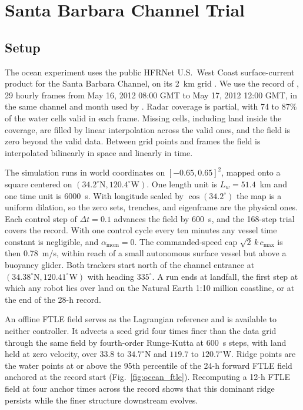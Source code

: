\documentclass[lettersize,journal]{IEEEtran}
\begin{document}
\section{Santa Barbara Channel Trial}
\label{sec:ocean}

\subsection{Setup}
\label{sec:ocean_sim}

The ocean experiment uses the public HFRNet U.S.~West Coast surface-current
product for the Santa Barbara Channel, on its 2~km grid \cite{34,36}. We
use the record of \cite{26}, 29 hourly frames from May 16, 2012 08:00 GMT
to May 17, 2012 12:00 GMT, in the same channel and month used by
\cite{29}. Radar coverage is partial, with 74 to 87\% of the water cells
valid in each frame. Missing cells, including land inside the coverage, are
filled by linear interpolation across the valid ones, and the field is zero
beyond the valid data. Between grid points and frames the field is
interpolated bilinearly in space and linearly in time.

The simulation runs in world coordinates on $[-0.65, 0.65]^2$, mapped onto
a square centered on $(34.2^{\circ}\mathrm{N}, 120.4^{\circ}\mathrm{W})$.
One length unit is $L_w = 51.4$~km and one time unit is 6000~s. With
longitude scaled by $\cos(34.2^{\circ})$ the map is a uniform dilation, so
the zero sets, trenches, and eigenframe are the physical ones. Each control
step of $\Delta t = 0.1$ advances the field by 600~s, and the 168-step trial
covers the record. With one control cycle every ten minutes any vessel
time constant is negligible, and $\alpha_{\text{mom}} = 0$. The
commanded-speed cap $\sqrt{2}\,k\,c_{\max}$ is then 0.78~m/s, within reach
of a small autonomous surface vessel but above a buoyancy glider. Both
trackers start north of the channel entrance at
$(34.38^{\circ}\mathrm{N}, 120.41^{\circ}\mathrm{W})$ with heading
$335^\circ$. A run ends at landfall, the first step at which any robot lies
over land on the Natural Earth 1:10 million coastline, or at the end of the
28-h record.

An offline FTLE field serves as the Lagrangian reference \cite{17} and is
available to neither controller. It advects a seed grid four times finer
than the data grid through the same field by fourth-order Runge-Kutta at
600~s steps, with land held at zero velocity, over $33.8$ to
$34.7^{\circ}$N and $119.7$ to $120.7^{\circ}$W. Ridge points are the
water points at or above the 95th percentile of the 24-h forward FTLE field
anchored at the record start (Fig.~\ref{fig:ocean_ftle}). Recomputing a
12-h FTLE field at four anchor times across the record shows that this
dominant ridge persists while the finer structure downstream evolves.
\end{document}
